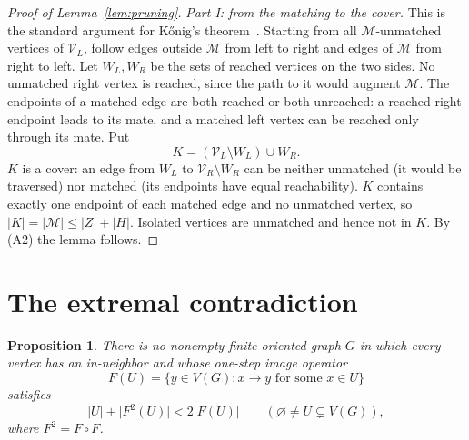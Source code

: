 \documentclass[11pt]{article}
\newtheorem{proposition}[theorem]{Proposition}
\theoremstyle{remark}
\newcommand{\abs}[1]{\lvert #1\rvert}
\begin{document}
\begin{proof}[Proof of Lemma~\ref{lem:pruning}]
\medskip\noindent
\emph{Part I: from the matching to the cover.}
This is the standard argument for K\H{o}nig's theorem~\cite{konig1931}.
Starting from all $\mathcal M$-unmatched vertices of $\mathcal V_L$, follow
edges outside $\mathcal M$ from left to right and edges of $\mathcal M$ from
right to left.  Let $W_L,W_R$ be the sets of reached vertices on the two
sides.  No unmatched right vertex is reached, since the path to it would
augment $\mathcal M$.  The endpoints of a matched edge are both reached or
both unreached: a reached right endpoint leads to its mate, and a matched
left vertex can be reached only through its mate.  Put
\[
 K=(\mathcal V_L\setminus W_L)\cup W_R .
\]
$K$ is a cover: an edge from $W_L$ to $\mathcal V_R\setminus W_R$ can be
neither unmatched (it would be traversed) nor matched (its endpoints have
equal reachability).  $K$ contains exactly one endpoint of each matched
edge and no unmatched vertex, so
$\abs K=\abs{\mathcal M}\le\abs Z+\abs H$.  Isolated vertices are unmatched
and hence not in $K$.  By (A2) the lemma follows.
\end{proof}

\section{The extremal contradiction}\label{sec:incompatibility}

\begin{proposition}\label{prop:no-concavity}
There is no nonempty finite oriented graph $G$ in which every vertex has an
in-neighbor and whose one-step image operator
\[
 F(U)=\{y\in V(G):x\to y\text{ for some }x\in U\}
\]
satisfies
\begin{equation}\label{eq:impossible-concavity}
 \abs{U}+\abs{F^2(U)}<2\abs{F(U)}
 \qquad(\varnothing\ne U\subsetneq V(G)),
\end{equation}
where $F^2=F\circ F$.
\end{proposition}
\end{document}
